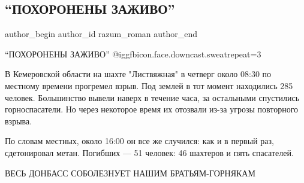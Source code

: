  
 
 
 
 
 
\subsection{\enquote{ПОХОРОНЕНЫ ЗАЖИВО}}
\label{sec:26_11_2021.fb.razum_roman.1.pohoroneny_zazhivo_kuzbass}
 
\ifcmt
 author_begin
   author_id razum_roman
 author_end
\fi

\enquote{ПОХОРОНЕНЫ ЗАЖИВО}  @igg{fbicon.face.downcast.sweat}{repeat=3} 


В Кемеровской области на шахте "Листвяжная" в четверг около 08:30 по местному
времени прогремел взрыв. Под землей в тот момент находились 285 человек.
Большинство вывели наверх в течение часа, за остальными спустились
горноспасатели. Но через некоторое время их отозвали из-за угрозы повторного
взрыва.

По словам местных, около 16:00 он все же случился: как и в первый раз,
сдетонировал метан. Погибших — 51 человек: 46 шахтеров и пять спасателей.

ВЕСЬ ДОНБАСС СОБОЛЕЗНУЕТ НАШИМ БРАТЬЯМ-ГОРНЯКАМ
